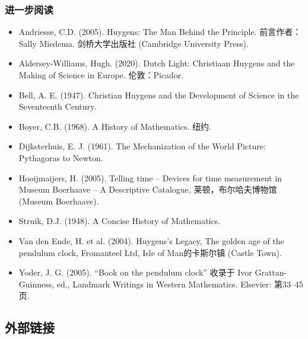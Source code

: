 \subsubsection{进一步阅读}
\begin{itemize}
\item Andriesse, C.D. (2005). Huygens: The Man Behind the Principle. 前言作者：Sally Miedema. 剑桥大学出版社 (Cambridge University Press).
\item Aldersey-Williams, Hugh. (2020). Dutch Light: Christiaan Huygens and the Making of Science in Europe. 伦敦：Picador.
\item Bell, A. E. (1947). Christian Huygens and the Development of Science in the Seventeenth Century.
\item Boyer, C.B. (1968). A History of Mathematics. 纽约.
\item Dijksterhuis, E. J. (1961). The Mechanization of the World Picture: Pythagoras to Newton.
\item Hooijmaijers, H. (2005). Telling time – Devices for time measurement in Museum Boerhaave – A Descriptive Catalogue, 莱顿，布尔哈夫博物馆 (Museum Boerhaave).
\item Struik, D.J. (1948). A Concise History of Mathematics.
\item Van den Ende, H. et al. (2004). Huygens's Legacy, The golden age of the pendulum clock, Fromanteel Ltd, Isle of Man的卡斯尔镇 (Castle Town).
\item Yoder, J. G. (2005). “Book on the pendulum clock” 收录于 Ivor Grattan-Guinness, ed., Landmark Writings in Western Mathematics. Elsevier: 第33–45页.
\end{itemize}
\subsection{外部链接}

